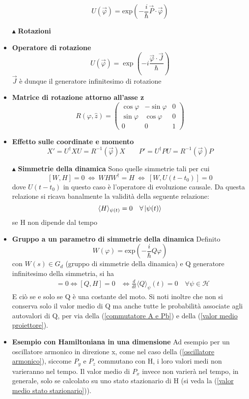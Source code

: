 \documentclass{book}
\newcommand{\g}{\textbf}
\newcommand{\e}{\begin{equation}}
\newcommand{\ex}{\end{equation} }
\renewcommand{\it}{\item[$\cdot$]}
\begin{document}
\begin{multicols}{4}
\begin{itemize}
     \e{U(\vec{\varphi}) = \text{exp}\left(-\frac{i}{\hbar}\vec{P}\cdot \vec{\varphi}\right)}\ex
\item [$\blacktriangle$] \g{Rotazioni}
    \it \g{Operatore di rotazione}
        \e{U(\vec{\varphi}) = \exp\left(-i\frac{\vec{\varphi} \cdot \vec{J}}{\hbar}\right)} \ex
        $\vec{J}$ è dunque il generatore infinitesimo di rotazione
        
    \it \g{Matrice di rotazione attorno all'asse z}
        \e{R(\varphi, \hat{z}) = 
        \begin{pmatrix}
            \cos\varphi & -\sin\varphi & 0\\ 
            \sin\varphi & \cos\varphi & 0 \\
            0 & 0 & 1
        \end{pmatrix}} \ex
    \it \g{Effetto sulle coordinate e momento}
        \e{X' = U^\dagger X U = R^{-1}(\vec{\varphi}) X \qquad P' = U^\dagger P U = R^{-1}(\vec{\varphi}) P} \ex

    \item[$\blacktriangle$] \g{Simmetrie della dinamica}
Sono quelle simmetrie tali per cui
\e{[W,H] = 0 \ \iff \ WHW^{\dagger} = H \ \iff \ [W, U(t-t_{0})] = 0}\ex
dove $U(t-t_{0})$ in questo caso è l'operatore di evoluzione causale. Da questa relazione si ricava banalmente la validità della seguente relazione:
\e{\langle H \rangle_{\psi({t})} = 0 \quad \forall \ket{\psi(t)}}\ex se H non dipende dal tempo
\it \g{Gruppo a un parametro di simmetrie della dinamica}
Definito 
\e{W(\varphi) = \text{exp}\left(-\frac{i}{\hbar}Q\varphi\right)}\ex con $W(s) \in G_{d}$ (gruppo di simmetrie della dinamica) e Q generatore infinitesimo della simmetria, si ha 
\begin{align}
    [W(s), H] &= 0 \iff [Q, H] = 0 
    &\iff \frac{d}{dt} \langle Q \rangle_{\psi}(t) = 0 \quad \forall \psi \in \mathcal{H}
\end{align}
E ciò se e solo se Q è una costante del moto. Si noti inoltre che non si conserva solo il valor medio di Q ma anche tutte le probabilità associate agli autovalori di Q, per via della (\ref{commutatore A e Pb}) e della (\ref{valor medio proiettore}).
\it \g{Esempio con Hamiltoniana in una dimensione}
Ad esempio per un oscillatore armonico in direzione x, come nel caso della (\ref{oscillatore armonico}), siccome $P_{y}$ e $P_{z}$ commutano con H, i loro valori medi non varieranno nel tempo. Il valor medio di $P_{x}$ invece non varierà nel tempo, in generale, solo se calcolato su uno stato stazionario di H (si veda la (\ref{valor medio stato stazionario})).


\end{itemize}
\end{multicols}
\end{document}
